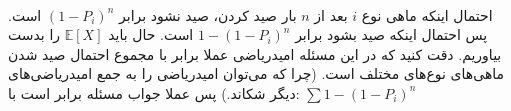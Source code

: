 \\
احتمال اینکه ماهی نوع
$i$
بعد از
$n$
بار صید کردن، صید نشود برابر
$(1 - P_i)^n$
است. پس احتمال اینکه صید بشود برابر
$1 - (1 - P_i)^n$
است.
حال باید
$\mathbb{E}[X]$
را بدست بیاوریم. دقت کنید که در این مسئله امیدریاضی عملا برابر با مجموع احتمال صید شدن ماهی‌های نوع‌های
مختلف است.
(چرا که می‌توان امیدریاضی را به جمع امیدریاضی‌های دیگر شکاند.)
پس عملا جواب مسئله برابر است با:
$\sum 1 - (1 - P_i)^n$
